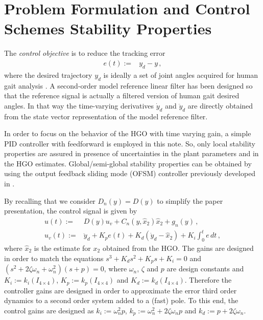 \documentclass[letterpaper, 10 pt, conference]{ieeeconf}  %
\theoremstyle{plain}
\theoremstyle{definition}
\theoremstyle{remark}
\begin{document}
\section{Problem Formulation and Control Schemes Stability Properties}

The {\em control objective} is to reduce the tracking error 
%
\begin{align}
e(t) := & y_{d} - y\,,
\end{align}
%
where the desired trajectory $y_d$ is ideally a set of joint angles acquired for human gait analysis \cite{Schwartz2008}.  A second-order model reference linear filter %
%
%
has been designed so that the reference signal is actually a filtered version of human gait desired angles. In that way the  time-varying derivatives $\dot{y}_d$ and $\ddot{y}_d$ are directly obtained from the state vector representation of the model reference filter.

In order to focus on the behavior of the HGO with time varying gain, a simple  PID controller with feedforward is employed  in this note. So, only local stability properties are assured in presence of uncertainties in the plant parameters and in the HGO estimates. Global/semi-global stability properties can be obtained by using the  output feedback sliding mode (OFSM) controller previously developed in \cite{POH:2011}.

By recalling that we  consider $D_n(y)=D(y)$ to simplify the paper presentation, the control  signal is given by
%
\begin{align}
u(t) := & D(y) u_v + C_{n}(y,\hat{x}_2) \hat{x}_2+g_{n}(y)\,, \\
u_v(t):= &\ddot{y}_d + K_p e(t) + {K_d (\dot{y}_d - \hat{x}_2)} + K_i\int_{0}^{t}e \, dt\,,
\label{eq:defu}
\end{align}
%
where $\hat{x}_2$ is the estimate for $x_2$ obtained from the HGO. The gains are designed in order to match the equations
$s^3 + K_ds^2 + K_ps + K_i = 0$ and $(s^2 + 2\zeta \omega_n + \omega_n^2)(s + p) = 0$, 
%
%
where $\omega_n$, $\zeta$ and $p$ are design constants and $K_i := k_i(I_{4 \times 4})$, $K_p := k_p(I_{4 \times 4})$ and $K_d := k_d(I_{4 \times 4})$. Therefore the controller gains are designed in order to approximate the error third order dynamics to a second order system added to a (fast) pole. To this end, the control gains are designed as $k_i := \omega_n^2p$, $k_p := \omega_n^2 + 2\zeta \omega_n p$ and $k_d := p + 2\zeta \omega_n$.
%
%
\end{document}
